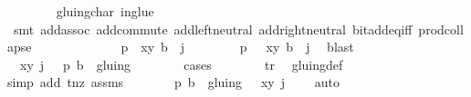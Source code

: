 \begin{isabellebody}
\ \ \ \ \ \ \isamarkupfalse%
\ gluing{\isacharunderscore}char\ in{\isacharunderscore}glue\ \isanewline
\ \ \ \ \ \ \isamarkupfalse%
\ {\isacharparenleft}smt\ add{\isachardot}assoc\ add{\isachardot}commute\ add{\isachardot}left{\isacharunderscore}neutral\ add{\isachardot}right{\isacharunderscore}neutral\ bit{\isacharunderscore}add{\isacharunderscore}eq{\isacharunderscore}{}{\isacharunderscore}iff\ prod{\isachardot}collapse{\isacharparenright}\isanewline
\ \ \ \ \isamarkupfalse%
\ \isamarkupfalse%
\isanewline
\ \ \ \ \ \ {\isacharparenleft}{}{\isacharparenright}\ {\isachardoublequoteopen}p\ {\isacharequal}\ {\isacharparenleft}x{\isacharcomma}y{\isacharparenright}{\isachardoublequoteclose}\ {\isachardoublequoteopen}b\ {\isacharequal}\ j{\isachardoublequoteclose}\ {\isacharbar}\isanewline
\ \ \ \ \ \ {\isacharparenleft}{}{\isacharparenright}\ {\isachardoublequoteopen}p\ {\isacharequal}\ {\isasymtau}\ {\isacharparenleft}x{\isacharcomma}y{\isacharparenright}{\isachardoublequoteclose}\ {\isachardoublequoteopen}b\ {\isacharequal}\ j{\isacharplus}{}{\isachardoublequoteclose}\ \isamarkupfalse%
\ blast\isanewline
\ \ \ \ \isamarkupfalse%
\ \isamarkupfalse%
\ {\isachardoublequoteopen}{\isacharparenleft}{\isacharparenleft}{\isasymtau}\ {\isacharparenleft}x{\isacharcomma}y{\isacharparenright}{\isacharcomma}\ j\ {\isacharplus}\ {}{\isacharparenright}{\isacharcomma}\ p{\isacharcomma}\ b{\isacharparenright}\ {\isasymin}\ gluing{\isachardoublequoteclose}\ \isanewline
\ \ \ \ \ \ \isamarkupfalse%
{\isacharparenleft}cases{\isacharparenright}\isanewline
\ \ \ \ \ \ \isamarkupfalse%
\ tr\ \isamarkupfalse%
\ gluing{\isacharunderscore}def\ \isamarkupfalse%
{\isacharparenleft}simp\ add{\isacharcolon}\ t{\isacharunderscore}nz\ assms{\isacharparenright}{\isacharplus}\isanewline
\ \ \ \ \isamarkupfalse%
\ \isamarkupfalse%
\ {\isachardoublequoteopen}{\isacharparenleft}p{\isacharcomma}\ b{\isacharparenright}\ {\isasymin}\ gluing\ {\isacharbackquote}{\isacharbackquote}\ {\isacharbraceleft}{\isacharparenleft}{\isasymtau}\ {\isacharparenleft}x{\isacharcomma}y{\isacharparenright}{\isacharcomma}\ j\ {\isacharplus}\ {}{\isacharparenright}{\isacharbraceright}{\isachardoublequoteclose}\ \isamarkupfalse%
\ auto\isacommand{{\isacharbraceright}}\isamarkupfalse%
\isanewline
\ \ \ \ \isamarkupfalse%

\end{isabellebody}
